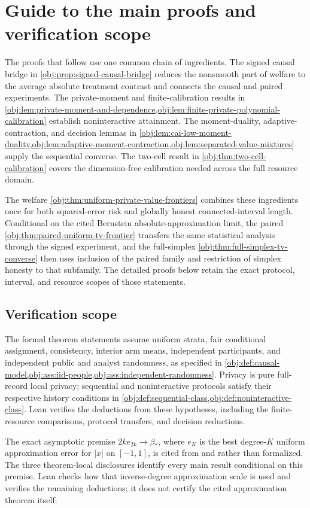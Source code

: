 \section{Guide to the main proofs and verification scope}

The proofs that follow use one common chain of ingredients. The signed causal bridge in \cref{obj:prop:signed-causal-bridge} reduces the nonsmooth part of welfare to the average absolute treatment contrast and connects the causal and paired experiments. The private-moment and finite-calibration results in \cref{obj:lem:private-moment-and-dependence,obj:lem:finite-private-polynomial-calibration} establish noninteractive attainment. The moment-duality, adaptive-contraction, and decision lemmas in \cref{obj:lem:cai-low-moment-duality,obj:lem:adaptive-moment-contraction,obj:lem:separated-value-mixtures} supply the sequential converse. The two-cell result in \cref{obj:thm:two-cell-calibration} covers the dimension-free calibration needed across the full resource domain.

The welfare \cref{obj:thm:uniform-private-value-frontiers} combines these ingredients once for both squared-error risk and globally honest connected-interval length. Conditional on the cited Bernstein absolute-approximation limit, the paired \cref{obj:thm:paired-uniform-tv-frontier} transfers the same statistical analysis through the signed experiment, and the full-simplex \cref{obj:thm:full-simplex-tv-converse} then uses inclusion of the paired family and restriction of simplex honesty to that subfamily. The detailed proofs below retain the exact protocol, interval, and resource scopes of those statements.

\subsection{Verification scope}

The formal theorem statements assume uniform strata, fair conditional assignment, consistency, interior arm means, independent participants, and independent public and analyst randomness, as specified in \cref{obj:def:causal-model,obj:ass:iid-people,obj:ass:independent-randomness}. Privacy is pure full-record local privacy; sequential and noninteractive protocols satisfy their respective history conditions in \cref{obj:def:sequential-class,obj:def:noninteractive-class}. Lean verifies the deductions from these hypotheses, including the finite-resource comparisons, protocol transfers, and decision reductions.

The exact asymptotic premise \(2k e_{2k}\to\beta_*\), where \(e_K\) is the best degree-\(K\) uniform approximation error for \(|x|\) on \([-1,1]\), is cited from \citet[Section 3.1]{CaiLow2011Nonsmooth} and \citet{Bernstein1913} rather than formalized. The three theorem-local disclosures identify every main result conditional on this premise. Lean checks how that inverse-degree approximation scale is used and verifies the remaining deductions; it does not certify the cited approximation theorem itself.
